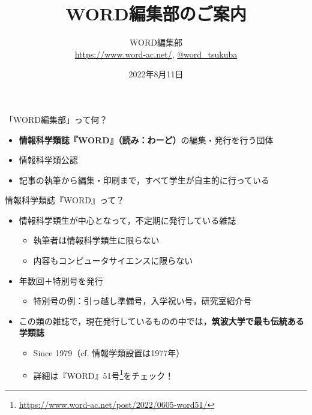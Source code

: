 \documentclass[lualatex]{beamer}
\title{\textbf{WORD編集部のご案内}}
\author{WORD編集部\\\url{https://www.word-ac.net/}, \href{https://twitter.com/word\_tsukuba}{@word\_tsukuba}}
\date{2022年8月11日}   %
\begin{document}
\maketitle
\begin{frame}[plain]{「WORD編集部」って何？}
\begin{itemize}
 \item \alert{\textbf{情報科学類誌『WORD』（読み：わーど）}}の編集・発行を行う団体
 \item 情報科学類公認
 \item 記事の執筆から編集・印刷まで，すべて学生が自主的に行っている
\end{itemize}
\end{frame}
\begin{frame}[plain]{情報科学類誌『WORD』って？}
 \begin{itemize}
  \item 情報科学類生が中心となって，不定期に発行している雑誌
  \begin{itemize}
   \item 執筆者は情報科学類生に限らない
   \item 内容もコンピュータサイエンスに限らない
  \end{itemize}
  \item 年数回＋特別号を発行
  \begin{itemize}
   \item 特別号の例：引っ越し準備号，入学祝い号，研究室紹介号
  \end{itemize}
  \item \alert{この類の雑誌で，現在発行しているものの中では，\textbf{筑波大学で最も伝統ある学類誌}}
  \begin{itemize}
   \item Since 1979（cf. 情報学類設置は1977年）
   \item 詳細は『WORD』51号\footnote{\url{https://www.word-ac.net/post/2022/0605-word51/}}をチェック！
  \end{itemize}
 \end{itemize}
\end{frame}
\end{document}
